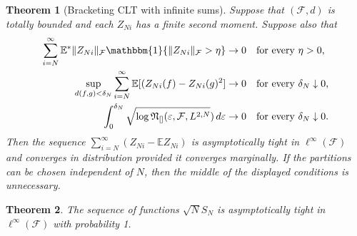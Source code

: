 \documentclass[10pt,a4paper]{amsart}
\newtheorem{thm}{Theorem}
\newcommand{\E}{\mathbb{E}}
\begin{document}
\begin{thm}[Bracketing CLT with infinite sums] \label{th::bracketing_clt}
    Suppose that $(\mathcal{F},d)$ is totally bounded and each $Z_{Ni}$ has a finite second moment. Suppose also that
    \begin{align*}
        \sum_{i=N}^{\infty} \E^{*}\Vert Z_{Ni}\Vert_{\mathcal{F}}\mathbbm{1}\{\Vert Z_{Ni}\Vert_{\mathcal{F}} > \eta \} &\rightarrow 0 \quad \text{for every $\eta > 0$,} \\
        \sup_{d(f,g) < \delta_{N}} \sum_{i=N}^{\infty} \E[(Z_{Ni}(f)-Z_{Ni}(g)^{2}] &\rightarrow 0\quad \text{for every $\delta_{N} \downarrow 0$,} \\ 
        \int_{0}^{\delta_{N}} \sqrt{\log \mathfrak{N}_{[]}(\varepsilon,\mathcal{F}, L^{2,N}})\,d\varepsilon &\rightarrow 0\quad \text{for every $\delta_{N} \downarrow 0$.} 
    \end{align*}
    Then the sequence $\sum_{i=N}^{\infty}(Z_{Ni}-\E Z_{Ni})$ is asymptotically tight in $\ell^{\infty}(\mathcal{F})$ and converges in distribution provided it converges marginally. If the partitions can be chosen independent of $N$, then the middle of the displayed conditions is unnecessary.
\end{thm}

\begin{thm}\label{th:tight}
The sequence of functions $\sqrt{N}S_N$ is  asymptotically tight in $\ell^{\infty}(\mathcal{F})$ with probability 1.
\end{thm}
\end{document}
